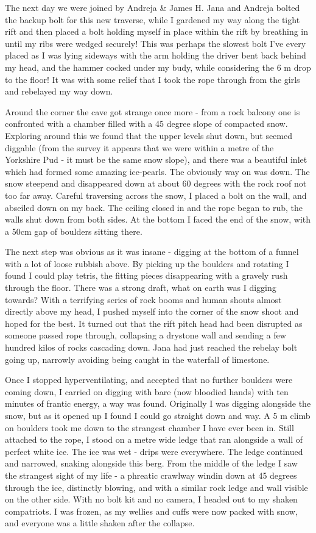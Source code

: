 The next day we were joined by Andreja \& James H. Jana and Andreja
bolted the backup bolt for this new traverse, while I gardened my way
along the tight rift and then placed a bolt holding myself in place
within the rift by breathing in until my ribs were wedged securely! This
was perhaps the slowest bolt I've every placed as I was lying sideways
with the arm holding the driver bent back behind my head, and the hammer
cocked under my budy, while considering the 6 m drop to the floor! It
was with some relief that I took the rope through from the girls and
rebelayed my way down.

Around the corner the cave got strange once more - from a rock balcony
one is confronted with a chamber filled with a 45 degree slope of
compacted snow. Exploring around this we found that the upper levels
shut down, but seemed diggable (from the survey it appears that we were
within a metre of the Yorkshire Pud - it must be the same snow slope),
and there was a beautiful inlet which had formed some amazing
ice-pearls. The obviously way on was down. The snow steepend and
disappeared down at about 60 degrees with the rock roof not too far
away. Careful traversing across the snow, I placed a bolt on the wall,
and abseiled down on my back. The ceiling closed in and the rope began
to rub, the walls shut down from both sides. At the bottom I faced the
end of the snow, with a 50cm gap of boulders sitting there.

The next step was obvious as it was insane - digging at the bottom of a
funnel with a lot of loose rubbish above. By picking up the boulders and
rotating I found I could play tetris, the fitting pieces disappearing
with a gravely rush through the floor. There was a strong draft, what on
earth was I digging towards? With a terrifying series of rock booms and
human shouts almost directly above my head, I pushed myself into the
corner of the snow shoot and hoped for the best. It turned out that the
rift pitch head had been disrupted as someone passed rope through,
collapsing a drystone wall and sending a few hundred kilos of rocks
cascading down. Jana had just reached the rebelay bolt going up,
narrowly avoiding being caught in the waterfall of limestone.

Once I stopped hyperventilating, and accepted that no further boulders
were coming down, I carried on digging with bare (now bloodied hands)
with ten minutes of frantic energy, a way was found. Originally I was
digging alongside the snow, but as it opened up I found I could go
straight down and way. A 5 m climb on boulders took me down to the
strangest chamber I have ever been in. Still attached to the rope, I
stood on a metre wide ledge that ran alongside a wall of perfect white
ice. The ice was wet - drips were everywhere. The ledge continued and
narrowed, snaking alongside this berg. From the middle of the ledge I
saw the strangest sight of my life - a phreatic crawlway windin down at
45 degrees through the ice, distinctly blowing, and with a similar rock
ledge and wall visible on the other side. With no bolt kit and no
camera, I headed out to my shaken compatriots. I was frozen, as my
wellies and cuffs were now packed with snow, and everyone was a little
shaken after the collapse.

